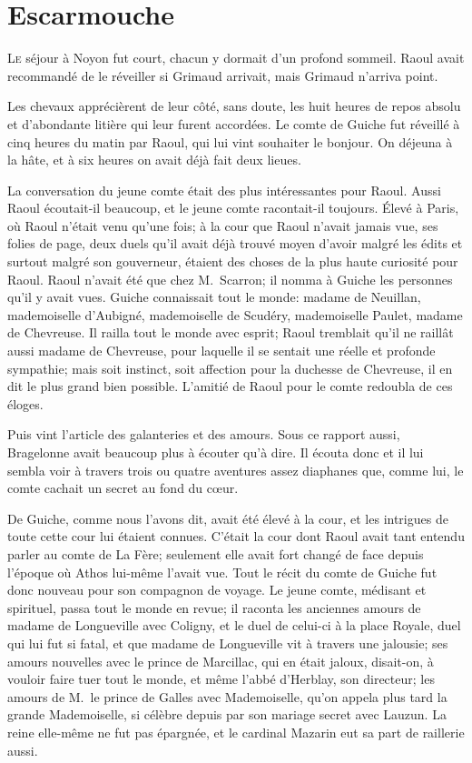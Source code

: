\chapter{Escarmouche}

\lettrine{L}{e} séjour à Noyon fut court, chacun y dormait d'un profond sommeil. Raoul avait recommandé de le réveiller si Grimaud arrivait, mais Grimaud n'arriva point.

\zz
Les chevaux apprécièrent de leur côté, sans doute, les huit heures de repos absolu et d'abondante litière qui leur furent accordées. Le comte de Guiche fut réveillé à cinq heures du matin par Raoul, qui lui vint souhaiter le bonjour. On déjeuna à la hâte, et à six heures on avait déjà fait deux lieues.

La conversation du jeune comte était des plus intéressantes pour Raoul. Aussi Raoul écoutait-il beaucoup, et le jeune comte racontait-il toujours. Élevé à Paris, où Raoul n'était venu qu'une fois; à la cour que Raoul n'avait jamais vue, ses folies de page, deux duels qu'il avait déjà trouvé moyen d'avoir malgré les édits et surtout malgré son gouverneur, étaient des choses de la plus haute curiosité pour Raoul. Raoul n'avait été que chez M.~Scarron; il nomma à Guiche les personnes qu'il y avait vues. Guiche connaissait tout le monde: madame de Neuillan, mademoiselle d'Aubigné, mademoiselle de Scudéry, mademoiselle Paulet, madame de Chevreuse. Il railla tout le monde avec esprit; Raoul tremblait qu'il ne raillât aussi madame de Chevreuse, pour laquelle il se sentait une réelle et profonde sympathie; mais soit instinct, soit affection pour la duchesse de Chevreuse, il en dit le plus grand bien possible. L'amitié de Raoul pour le comte redoubla de ces éloges.

Puis vint l'article des galanteries et des amours. Sous ce rapport aussi, Bragelonne avait beaucoup plus à écouter qu'à dire. Il écouta donc et il lui sembla voir à travers trois ou quatre aventures assez diaphanes que, comme lui, le comte cachait un secret au fond du cœur.

De Guiche, comme nous l'avons dit, avait été élevé à la cour, et les intrigues de toute cette cour lui étaient connues. C'était la cour dont Raoul avait tant entendu parler au comte de La Fère; seulement elle avait fort changé de face depuis l'époque où Athos lui-même l'avait vue. Tout le récit du comte de Guiche fut donc nouveau pour son compagnon de voyage. Le jeune comte, médisant et spirituel, passa tout le monde en revue; il raconta les anciennes amours de madame de Longueville avec Coligny, et le duel de celui-ci à la place Royale, duel qui lui fut si fatal, et que madame de Longueville vit à travers une jalousie; ses amours nouvelles avec le prince de Marcillac, qui en était jaloux, disait-on, à vouloir faire tuer tout le monde, et même l'abbé d'Herblay, son directeur; les amours de M.~le prince de Galles avec Mademoiselle, qu'on appela plus tard la grande Mademoiselle, si célèbre depuis par son mariage secret avec Lauzun. La reine elle-même ne fut pas épargnée, et le cardinal Mazarin eut sa part de raillerie aussi.

